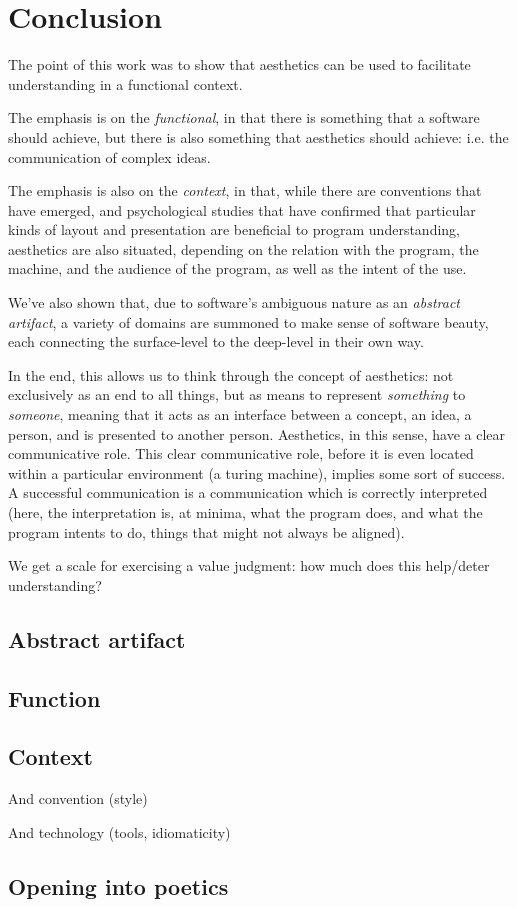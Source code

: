 \chapter{Conclusion} %

The point of this work was to show that aesthetics can be used to facilitate understanding in a functional context.

The emphasis is on the \emph{functional}, in that there is something that a software should achieve, but there is also something that aesthetics should achieve: i.e. the communication of complex ideas.

The emphasis is also on the \emph{context}, in that, while there are conventions that have emerged, and psychological studies that have confirmed that particular kinds of layout and presentation are beneficial to program understanding, aesthetics are also situated, depending on the relation with the program, the machine, and the audience of the program, as well as the intent of the use.

We've also shown that, due to software's ambiguous nature as an \emph{abstract artifact}, a variety of domains are summoned to make sense of software beauty, each connecting the surface-level to the deep-level in their own way.

In the end, this allows us to think through the concept of aesthetics: not exclusively as an end to all things, but as means to represent \emph{something} to \emph{someone}, meaning that it acts as an interface between a concept, an idea, a person, and is presented to another person. Aesthetics, in this sense, have a clear communicative role. This clear communicative role, before it is even located within a particular environment (a turing machine), implies some sort of success. A successful communication is a communication which is correctly interpreted (here, the interpretation is, at minima, what the program does, and what the program intents to do, things that might not always be aligned).

We get a scale for exercising a value judgment: how much does this help/deter understanding?

\section{Abstract artifact} %

\section{Function} %

\section{Context} %

And convention (style)

And technology (tools, idiomaticity)

\section{Opening into poetics} %
